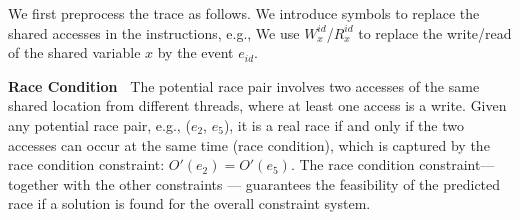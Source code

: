 








We first preprocess the trace as follows. We introduce symbols to replace the shared accesses in the instructions, e.g., We use $W^{id}_{x}$/$R^{id}_{x}$ to replace the write/read of the shared variable $x$ by the event $e_{id}$. %

{\bf Race Condition\ } The potential race pair involves two accesses of the same shared location from different threads, where at least one access is a write. Given any potential race pair, e.g., ($e_2$, $e_5$), it is a real race if and only if the two accesses can occur at the same time (race condition), which is captured by the race condition constraint: 
$O'(e_2) = O'(e_5)$.
The race condition constraint--- together with the other constraints --- guarantees the feasibility of the predicted race if a solution is found for the overall constraint system.

